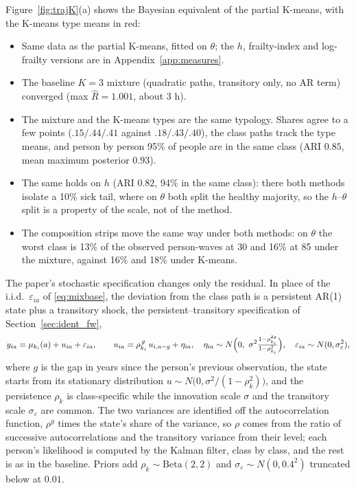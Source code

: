 \documentclass[11pt]{article}
\begin{document}
	Figure~\ref{fig:trajK}(a) shows the Bayesian equivalent of the partial K-means, with the K-means type means in red:
	\begin{itemize}
		\item Same data as the partial K-means, fitted on $\theta$; the $h$, frailty-index and log-frailty versions are in Appendix~\ref{app:measures}.
		\item The baseline $K=3$ mixture (quadratic paths, transitory only, no AR term) converged (max $\hat R = 1.001$, about 3 h).
		\item The mixture and the K-means types are the same typology. Shares agree to a few points ($.15/.44/.41$ against $.18/.43/.40$), the class paths track the type means, and person by person 95\% of people are in the same class (ARI $0.85$, mean maximum posterior $0.93$).
		\item The same holds on $h$ (ARI $0.82$, 94\% in the same class): there both methods isolate a 10\% sick tail, where on $\theta$ both split the healthy majority, so the $h$--$\theta$ split is a property of the scale, not of the method.
		\item The composition strips move the same way under both methods: on $\theta$ the worst class is 13\% of the observed person-waves at 30 and 16\% at 85 under the mixture, against 16\% and 18\% under K-means.
	\end{itemize}
	

	
	The paper's stochastic specification changes only the residual. In place of the i.i.d.\ $\varepsilon_{ia}$ of \eqref{eq:mixbase}, the deviation from the class path is a persistent AR(1) state plus a transitory shock, the persistent--transitory specification of Section~\ref{sec:ident_fw},
	\begin{equation}
		y_{ia}=\mu_{k_i}(a)+u_{ia}+\varepsilon_{ia},\qquad u_{ia}=\rho_{k_i}^{\,g}\,u_{i,a-g}+\eta_{ia},\quad \eta_{ia}\sim N\Bigl(0,\ \sigma^{2}\tfrac{1-\rho_{k_i}^{2g}}{1-\rho_{k_i}^{2}}\Bigr),\quad \varepsilon_{ia}\sim N(0,\sigma_{\varepsilon}^{2}),
		\label{eq:mixssm}
	\end{equation}
	where $g$ is the gap in years since the person's previous observation, the state starts from its stationary distribution $u\sim N\bigl(0,\sigma^2/(1-\rho_{k}^2)\bigr)$, and the persistence $\rho_k$ is class-specific while the innovation scale $\sigma$ and the transitory scale $\sigma_\varepsilon$ are common. The two variances are identified off the autocorrelation function, $\rho^{g}$ times the state's share of the variance, so $\rho$ comes from the ratio of successive autocorrelations and the transitory variance from their level; each person's likelihood is computed by the Kalman filter, class by class, and the rest is as in the baseline. Priors add $\rho_k\sim\mathrm{Beta}(2,2)$ and $\sigma_\varepsilon\sim N(0,0.4^2)$ truncated below at $0.01$.
	
\end{document}
